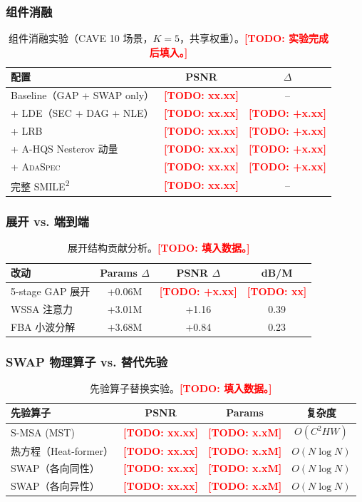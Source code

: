 \documentclass[a4paper,11pt,twocolumn]{ctexart}
\newcommand{\smiletwo}{SMILE\textsuperscript{2}}
\newcommand{\swap}{\textsc{SWAP}}
\newcommand{\lde}{\textsc{LDE}}
\newcommand{\ahqs}{\textsc{A-HQS}}
\newcommand{\adaspec}{\textsc{AdaSpec}}
\newcommand{\secm}{\textsc{SEC}}
\newcommand{\dag}{\textsc{DAG}}
\newcommand{\nle}{\textsc{NLE}}
\newcommand{\lrb}{\textsc{LRB}}
\newcommand{\todo}[1]{\textcolor{red}{\textbf{[TODO: #1]}}}
\begin{document}
\subsubsection{组件消融}

\begin{table}[t]
\centering
\caption{组件消融实验（CAVE 10 场景，$K=5$，共享权重）。\todo{实验完成后填入。}}
\label{tab:ablation_component}
\small
\begin{tabular}{l|cc}
\toprule
配置 & PSNR & $\Delta$ \\
\midrule
Baseline（GAP + \swap{} only） & \todo{xx.xx} & -- \\
+ \lde{}（\secm{} + \dag{} + \nle{}） & \todo{xx.xx} & \todo{+x.xx} \\
+ \lrb{} & \todo{xx.xx} & \todo{+x.xx} \\
+ \ahqs{} Nesterov 动量 & \todo{xx.xx} & \todo{+x.xx} \\
+ \adaspec{} & \todo{xx.xx} & \todo{+x.xx} \\
\midrule
完整 \smiletwo{} & \todo{xx.xx} & -- \\
\bottomrule
\end{tabular}
\end{table}


\subsubsection{展开 vs. 端到端}

\begin{table}[t]
\centering
\caption{展开结构贡献分析。\todo{填入数据。}}
\label{tab:ablation_unfolding}
\small
\begin{tabular}{l|cc|c}
\toprule
改动 & Params $\Delta$ & PSNR $\Delta$ & dB/M \\
\midrule
5-stage GAP 展开 & +0.06M & \todo{+x.xx} & \todo{xx} \\
WSSA 注意力 & +3.01M & +1.16 & 0.39 \\
FBA 小波分解 & +3.68M & +0.84 & 0.23 \\
\bottomrule
\end{tabular}
\end{table}


\subsubsection{\swap{} 物理算子 vs. 替代先验}

\begin{table}[t]
\centering
\caption{先验算子替换实验。\todo{填入数据。}}
\label{tab:ablation_prior}
\small
\begin{tabular}{l|ccc}
\toprule
先验算子 & PSNR & Params & 复杂度 \\
\midrule
S-MSA (MST) & \todo{xx.xx} & \todo{x.xM} & $O(C^2HW)$ \\
热方程（Heat-former） & \todo{xx.xx} & \todo{x.xM} & $O(N\log N)$ \\
\swap{}（各向同性） & \todo{xx.xx} & \todo{x.xM} & $O(N\log N)$ \\
\swap{}（各向异性） & \todo{xx.xx} & \todo{x.xM} & $O(N\log N)$ \\
\bottomrule
\end{tabular}
\end{table}
\end{document}
